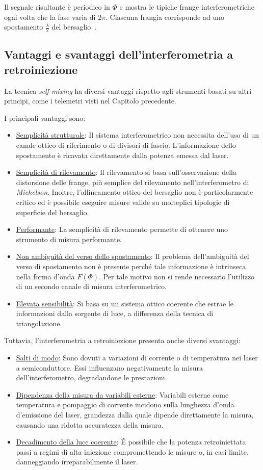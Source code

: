 Il segnale risultante è periodico in $\Phi$ e mostra le tipiche frange interferometriche ogni volta che la fase varia di $2\pi$. Ciascuna frangia corrisponde ad uno spostamento $\frac{\lambda}{2}$ del bersaglio~\cite{341714}.

\subsection{Vantaggi e svantaggi dell'interferometria a retroiniezione}
La tecnica \textit{self-mixing} ha diversi vantaggi rispetto agli strumenti basati su altri principi, come i telemetri visti nel Capitolo precedente.

I principali vantaggi sono:
\begin{itemize}
	\item \underline{Semplicità strutturale}: Il sistema interferometrico non necessita dell'uso di un canale ottico di riferimento o di divisori di fascio. L'informazione dello spostamento è ricavata direttamente dalla potenza emessa dal laser.
	\item \underline{Semplicità di rilevamento}: Il rilevamento si basa sull'osservazione della distorsione delle frange, più semplice del rilevamento nell'interferometro di \textit{Michelson}. Inoltre, l'allineamento ottico del bersaglio non è particolarmente critico ed è possibile eseguire misure valide su molteplici tipologie di superficie del bersaglio.
	\item \underline{Performante}: La semplicità di rilevamento permette di ottenere uno strumento di misura performante.
	\item \underline{Non ambiguità del verso dello spostamento}: Il problema dell'ambiguità del verso di spostamento non è presente perché tale informazione è intrinseca nella forma d'onda $F(\Phi)$. Per tale motivo non si rende necessario l'utilizzo di un secondo canale di misura interferometrico. 
	\item \underline{Elevata sensibilità}: Si basa su un sistema ottico coerente che estrae le informazioni dalla sorgente di luce, a differenza della tecnica di triangolazione.
\end{itemize}
Tuttavia, l'interferometria a retroiniezione presenta anche diversi svantaggi:
\begin{itemize}
	\item \underline{Salti di modo}: Sono dovuti a variazioni di corrente o di temperatura nei laser a semiconduttore. Essi influenzano negativamente la misura dell'interferometro, degradandone le prestazioni.
	\item \underline{Dipendenza della misura da variabili esterne}: Variabili esterne come temperatura e pompaggio di corrente incidono sulla lunghezza d'onda d'emissione del laser, grandezza dalla quale dipende direttamente la misura, causando una ridotta accuratezza della misura.
	\item \underline{Decadimento della luce coerente}: \'E possibile che la potenza retroiniettata passi a regimi di alta iniezione compromettendo le misure o, in casi limite, danneggiando irreparabilmente il laser. 
\end{itemize}

